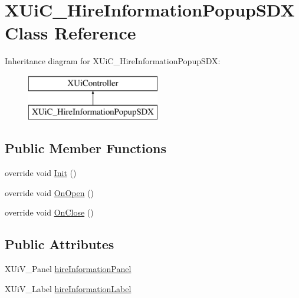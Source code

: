 \hypertarget{class_x_ui_c___hire_information_popup_s_d_x}{}\section{X\+Ui\+C\+\_\+\+Hire\+Information\+Popup\+S\+DX Class Reference}
\label{class_x_ui_c___hire_information_popup_s_d_x}
Inheritance diagram for X\+Ui\+C\+\_\+\+Hire\+Information\+Popup\+S\+DX\+:\begin{figure}[H]
\begin{center}
\leavevmode
\includegraphics[height=2.000000cm]{d6/d9a/class_x_ui_c___hire_information_popup_s_d_x}
\end{center}
\end{figure}
\subsection*{Public Member Functions}
\begin{DoxyCompactItemize}
\item 
override void \mbox{\hyperlink{class_x_ui_c___hire_information_popup_s_d_x_ab8a280e23dab0b26daeb990b4ec11f2b}{Init}} ()
\item 
override void \mbox{\hyperlink{class_x_ui_c___hire_information_popup_s_d_x_a8d916a709f57066529f68cf4a56993aa}{On\+Open}} ()
\item 
override void \mbox{\hyperlink{class_x_ui_c___hire_information_popup_s_d_x_aa080efe2cac66ade321e5c8505e9d4ec}{On\+Close}} ()
\end{DoxyCompactItemize}
\subsection*{Public Attributes}
\begin{DoxyCompactItemize}
\item 
X\+Ui\+V\+\_\+\+Panel \mbox{\hyperlink{class_x_ui_c___hire_information_popup_s_d_x_a7999bc75d84227b4f299be112ed5cdb9}{hire\+Information\+Panel}}
\item 
X\+Ui\+V\+\_\+\+Label \mbox{\hyperlink{class_x_ui_c___hire_information_popup_s_d_x_a3763d717b8a7052ee37aaa0607c5f293}{hire\+Information\+Label}}
\end{DoxyCompactItemize}


